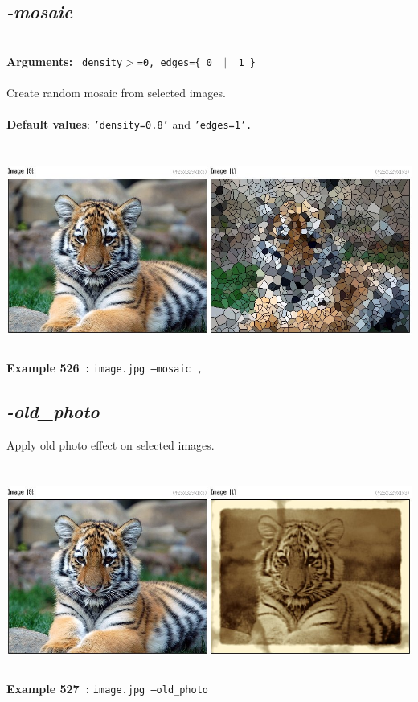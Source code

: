 \documentclass[a4paper,11pt,twoside]{book}
\begin{document}
\subsection{\emph{-mosaic} }\vspace*{-0.5em}
~\\\textbf{Arguments: } 
{\small \texttt{\_density$>$=0,\_edges=\{ 0 ~$|$~ 1 \}}}\\~\\
Create random mosaic from selected images.
~\\~\\\textbf{Default values}: {\small \texttt{'density=0.8'} and \texttt{'edges=1'.}}
\begin{center}\includegraphics[keepaspectratio=true,height=7cm,width=\textwidth]{img/gmic_def526.jpg}\\
{\footnotesize \textbf{Example 526~:} \texttt{image.jpg --mosaic ,}}
\end{center}

\subsection{\emph{-old\_photo} }\vspace*{-0.5em}
Apply old photo effect on selected images.
\begin{center}\includegraphics[keepaspectratio=true,height=7cm,width=\textwidth]{img/gmic_def527.jpg}\\
{\footnotesize \textbf{Example 527~:} \texttt{image.jpg --old\_photo}}
\end{center}
\end{document}
